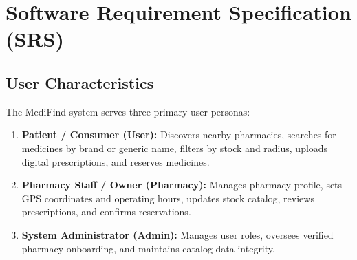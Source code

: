 \documentclass[12pt,a4paper]{report}
\begin{document}
\newpage
\chapter{Software Requirement Specification (SRS)}

\section{User Characteristics}
The MediFind system serves three primary user personas:
\begin{enumerate}
    \item \textbf{Patient / Consumer (User):} Discovers nearby pharmacies, searches for medicines by brand or generic name, filters by stock and radius, uploads digital prescriptions, and reserves medicines.
    \item \textbf{Pharmacy Staff / Owner (Pharmacy):} Manages pharmacy profile, sets GPS coordinates and operating hours, updates stock catalog, reviews prescriptions, and confirms reservations.
    \item \textbf{System Administrator (Admin):} Manages user roles, oversees verified pharmacy onboarding, and maintains catalog data integrity.
\end{enumerate}
\end{document}
